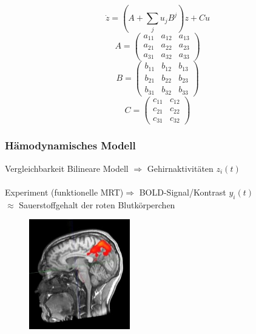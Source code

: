 \documentclass{beamer}
\begin{document}
	\begin{frame}{}
		\[\dot{z}=(A+\sum_{j}u_jB^j)z+Cu\]
		  \[
		 A=\left(\begin{array}{ccc} 
		  a_{11} &  a_{12} & a_{13} \\a_{21} &  a_{22} & a_{23} \\a_{31} &  a_{32} & a_{33}
		  \end{array}\right) 
		  \]
		  \[
		  B=\left(\begin{array}{ccc} 
		  b_{11} &  b_{12} & b_{13} \\b_{21} &  b_{22} & b_{23} \\b_{31} &  b_{32} & b_{33}
		  \end{array}\right) 
		  \]
		  \[
		  C=\left(\begin{array}{cc} 
		  c_{11} &  c_{12} \\c_{21} &  c_{22} \\c_{31} &  c_{32} 
		  \end{array}\right) 
		  \]
	\end{frame}
	
\subsubsection{Hämodynamisches Modell}
\begin{frame}{Vergleichbarkeit}
Bilineare Modell $\Rightarrow$ Gehirnaktivitäten $z_i(t)$\\~\\
\pause
Experiment (funktionelle MRT)$\Rightarrow$ BOLD-Signal/Kontrast $y_i(t)$\\
\hspace{3cm} $\approx$ Sauerstoffgehalt der roten Blutkörperchen 
\begin{figure}
{\includegraphics[width=4.4cm]{bold_signal.jpg}}
\end{figure}
\end{frame}
\end{document}
